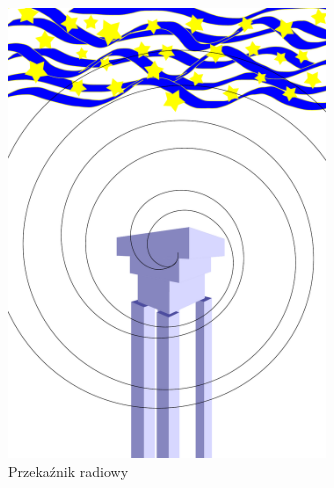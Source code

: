 \documentclass{article}
\begin{document}
\begin{large}
\newpage
\begin{figure}[!ht]
	\centering
		\includegraphics[width=0.75\textwidth]{wektorowa.pdf}
	\caption{Przekaźnik radiowy}
	\label{fig:Przekaźnik radiowy}
\end{figure}

\newpage




\end{large}
\end{document}
